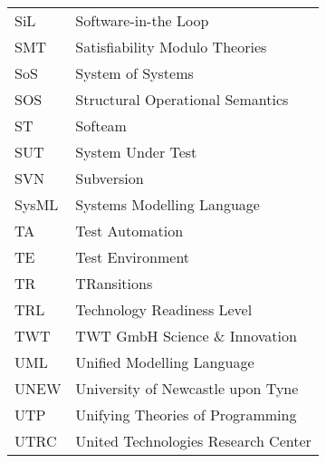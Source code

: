 \begin{longtable}{ll}
SiL	& Software-in-the Loop\\
SMT & Satisfiability Modulo Theories \\
SoS     &System of Systems\\
SOS     &Structural Operational Semantics\\
ST      &Softeam\\
SUT     &System Under Test\\
SVN	&Subversion\\
SysML	&Systems Modelling Language\\
TA      &Test Automation\\
TE & Test Environment\\
TR & TRansitions \\
TRL     &Technology Readiness Level\\
TWT & TWT GmbH Science \& Innovation\\
UML	&Unified Modelling Language\\
UNEW	&University of Newcastle upon Tyne\\
UTP     &Unifying Theories of Programming\\
UTRC    & United Technologies Research Center\\

\end{longtable}
